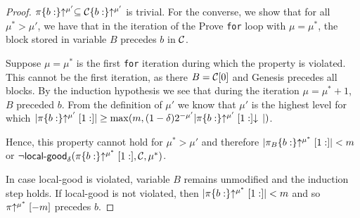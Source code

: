 \begin{proof}
    $\pi\{b:\}\negthickspace\uparrow^{\mu'} \subseteq \mathcal{C}\{b:\}\negthickspace\uparrow^{\mu'}$ is trivial.
    For the converse, we show that for all $\mu^* > \mu'$, we have that in
    the iteration of the Prove \texttt{for} loop with $\mu = \mu^*$, the block
    stored in variable $B$ precedes $b$ in $\mathcal{C}$.

    Suppose $\mu = \mu^*$ is the first \texttt{for} iteration during which the
    property is violated. This cannot be the first iteration, as there
    $B = \mathcal{C}[0]$ and Genesis precedes all blocks. By the
    induction hypothesis we see that during the iteration $\mu = \mu^* + 1$,
    $B$ preceded $b$. From the definition of $\mu'$ we know
    that $\mu'$ is the highest level for which
    $|\pi\{b:\}\negthickspace\uparrow^{\mu'}[1:]|
    \geq \max(m, (1 -
    \delta)2^{-\mu'}|\pi\{b:\}\negthickspace\uparrow^{\mu'}[1:]\negthickspace\downarrow\,|)$.

    Hence, this
    property cannot hold for $\mu^* > \mu'$ and therefore
    $|\pi_B\{b:\}\negthickspace\uparrow^{\mu^*}[1:]| < m$ or $\lnot
    \textsf{local-good}_\delta(\pi\{b:\}\negthickspace\uparrow^{\mu^*}[1:], \mathcal{C}, \mu^*)$.

    In case \textsf{local-good} is violated, variable $B$ remains unmodified and
    the induction step holds. If \textsf{local-good} is not violated, then
    $|\pi\{b:\}\negthickspace\uparrow^{\mu^*}[1:]| < m$ and so $\pi\negthickspace\uparrow^{\mu^*}[-m]$
    precedes $b$.
    \Qed
\end{proof}


